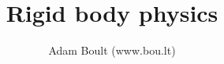 \documentclass[oneside]{book}
\begin{document}
\author{Adam Boult (www.bou.lt)}
\title{Rigid body physics}
\maketitle

\setcounter{tocdepth}{0}
\tableofcontents


\end{document}
